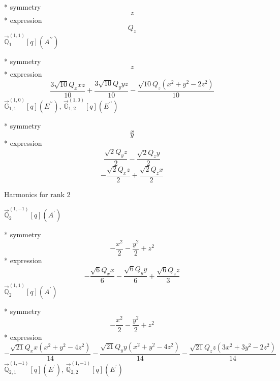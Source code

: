 \documentclass[fleqn,8pt]{jsarticle}
\begin{document}
\noindent\quad ** symmetry
\begin{dmath*}
z
\end{dmath*}
\noindent\quad ** expression
\begin{dmath*}
Q_{z}
\end{dmath*}
\noindent\quad $\vec{\mathbb{Q}}_{1}^{(1,1)}[q](A^{\prime\prime})$

\noindent\quad ** symmetry
\begin{dmath*}
z
\end{dmath*}
\noindent\quad ** expression
\begin{dmath*}
\frac{3 \sqrt{10} Q_{x} x z}{10} + \frac{3 \sqrt{10} Q_{y} y z}{10} - \frac{\sqrt{10} Q_{z} \left(x^{2} + y^{2} - 2 z^{2}\right)}{10}
\end{dmath*}
\noindent\quad $\vec{\mathbb{G}}_{1,1}^{(1,0)}[q](E^{\prime\prime})$, $\vec{\mathbb{G}}_{1,2}^{(1,0)}[q](E^{\prime\prime})$

\noindent\quad ** symmetry
\begin{dmath*}
x
\end{dmath*}
\begin{dmath*}
y
\end{dmath*}
\noindent\quad ** expression
\begin{dmath*}
\frac{\sqrt{2} Q_{y} z}{2} - \frac{\sqrt{2} Q_{z} y}{2}
\end{dmath*}
\begin{dmath*}
- \frac{\sqrt{2} Q_{x} z}{2} + \frac{\sqrt{2} Q_{z} x}{2}
\end{dmath*}

\noindent * Harmonics for rank 2

\noindent\quad $\vec{\mathbb{Q}}_{2}^{(1,-1)}[q](A^{\prime})$

\noindent\quad ** symmetry
\begin{dmath*}
- \frac{x^{2}}{2} - \frac{y^{2}}{2} + z^{2}
\end{dmath*}
\noindent\quad ** expression
\begin{dmath*}
- \frac{\sqrt{6} Q_{x} x}{6} - \frac{\sqrt{6} Q_{y} y}{6} + \frac{\sqrt{6} Q_{z} z}{3}
\end{dmath*}
\noindent\quad $\vec{\mathbb{Q}}_{2}^{(1,1)}[q](A^{\prime})$

\noindent\quad ** symmetry
\begin{dmath*}
- \frac{x^{2}}{2} - \frac{y^{2}}{2} + z^{2}
\end{dmath*}
\noindent\quad ** expression
\begin{dmath*}
- \frac{\sqrt{21} Q_{x} x \left(x^{2} + y^{2} - 4 z^{2}\right)}{14} - \frac{\sqrt{21} Q_{y} y \left(x^{2} + y^{2} - 4 z^{2}\right)}{14} - \frac{\sqrt{21} Q_{z} z \left(3 x^{2} + 3 y^{2} - 2 z^{2}\right)}{14}
\end{dmath*}
\noindent\quad $\vec{\mathbb{Q}}_{2,1}^{(1,-1)}[q](E^{\prime})$, $\vec{\mathbb{Q}}_{2,2}^{(1,-1)}[q](E^{\prime})$
\end{document}
